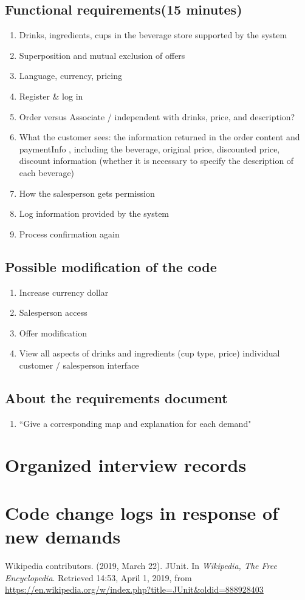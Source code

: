 \documentclass[a4paper]{report}
\begin{document}
\subsection{Functional requirements(15 minutes)}
\begin{enumerate}
\item Drinks, ingredients, cups in the beverage store supported by the system 
\item Superposition and mutual exclusion of offers 
\item Language, currency, pricing 
\item Register \& log in 
\item Order versus Associate / independent with drinks, price, and description?
\item What the customer sees: the information returned in the order content and paymentInfo , including the beverage, original price, discounted price, discount information (whether it is necessary to specify the description of each beverage) 
\item How the salesperson gets permission 
\item Log information provided by the system 
\item Process confirmation again
\end{enumerate}
\subsection{Possible modification of the code}
\begin{enumerate}
\item Increase currency dollar 
\item Salesperson access 
\item Offer modification 
\item View all aspects of drinks and ingredients (cup type, price) individual customer / salesperson interface 
\end{enumerate}
\subsection{About the requirements document }
\begin{enumerate}
\item ``Give a corresponding map and explanation for each demand"
\end{enumerate}
\section{Organized interview records}
\section{Code change logs in response of new demands}

\begin{thebibliography}{A}


Wikipedia contributors. (2019, March 22). JUnit. In \emph{Wikipedia, The Free Encyclopedia}. Retrieved 14:53, April 1, 2019, from \url{https://en.wikipedia.org/w/index.php?title=JUnit&oldid=888928403}
\end{thebibliography}
\end{document}
